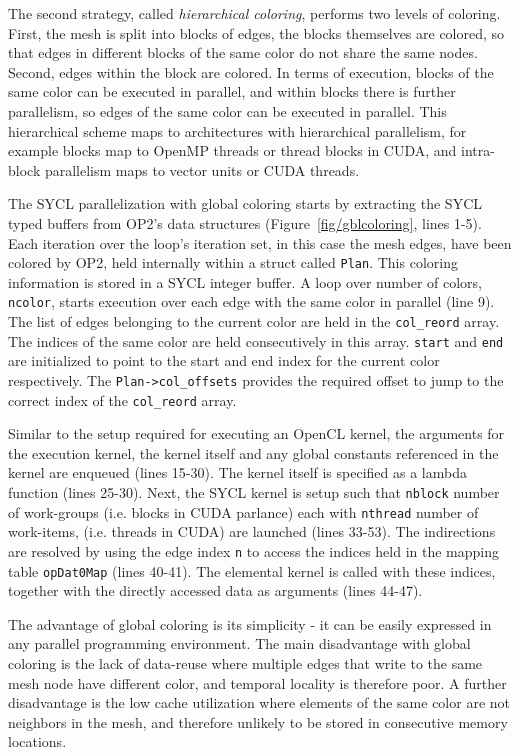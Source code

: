 \documentclass[runningheads]{llncs}
\begin{document}
The second strategy, called \emph{hierarchical coloring}, performs two levels 
of coloring. First, the mesh is split into blocks of edges, the blocks 
themselves are colored, so that edges in different blocks of the same color do 
not share the same nodes. Second, edges within the block are colored. In terms 
of execution, blocks of the same color can be executed in parallel, and within 
blocks there is further parallelism, so edges of the same color can be executed 
in parallel. This hierarchical scheme maps to architectures with hierarchical 
parallelism, for example blocks map to OpenMP threads or thread blocks in CUDA, 
and intra-block parallelism maps to vector units or CUDA threads.

The SYCL parallelization with global coloring starts by extracting the SYCL typed 
buffers from OP2's data structures (Figure~\ref{fig/gblcoloring}, lines 1-5). 
Each iteration over the loop's iteration set, in this case the mesh edges,  have 
been colored by OP2, held internally within a struct called \texttt{Plan}. This 
coloring information is stored in a SYCL integer buffer. A loop over number of 
colors, \texttt{ncolor}, starts execution over each edge with the same color in 
parallel (line 9). The list of edges belonging to the current color are held in 
the \texttt{col\_reord} array. The indices of the same color are held 
consecutively in this array. \texttt{start} and \texttt{end} are initialized to 
point to the start and end index for the current color respectively. The 
\texttt{Plan->col\_offsets} provides the required offset to jump to the correct 
index of the \texttt{col\_reord} array. 

Similar to the setup required for executing an OpenCL kernel, the 
arguments for the execution kernel, the kernel itself and any global constants 
referenced in the kernel are enqueued (lines 15-30). The kernel itself is 
specified as a lambda function (lines 25-30). Next, the SYCL kernel is setup 
such that \texttt{nblock} number of work-groups (i.e. blocks in CUDA parlance) 
each with \texttt{nthread} number of work-items, (i.e. threads in CUDA) are 
launched (lines 33-53). The indirections are resolved by using the edge index 
\texttt{n} to access the indices held in the mapping table \texttt{opDat0Map} 
(lines 40-41). The elemental kernel is called with these indices, together with 
the directly accessed data as arguments (lines 44-47).  

The advantage of global coloring is its simplicity - it can be easily expressed 
in any parallel programming environment. The main disadvantage with global 
coloring is the lack of data-reuse where multiple edges that write to the same 
mesh node have different color, and temporal locality is therefore poor. A 
further disadvantage is the low cache utilization where elements of the same 
color are not neighbors in the mesh, and therefore unlikely to be stored in 
consecutive memory locations. 
\end{document}
